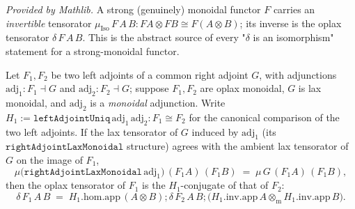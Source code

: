 \begin{lemma}
  \label{lem:functor_monoidal_muiso}
  \mathlibok
  \textit{Provided by Mathlib.}
  A strong (genuinely) monoidal functor \(F\) carries an \emph{invertible} tensorator
  \(\mu_{\mathrm{Iso}}\,F\,A\,B : F A \otimes F B \cong F(A \otimes B)\); its inverse is the oplax
  tensorator \(\delta\,F\,A\,B\). This is the abstract source of every "\(\delta\) is an
  isomorphism" statement for a strong-monoidal functor.
\end{lemma}

\begin{lemma}\leanok
  \label{lem:deltaconjofmucomparison}
  Let \(F_1, F_2\) be two left adjoints of a common right adjoint \(G\), with adjunctions
  \(\mathrm{adj}_1 : F_1 \dashv G\) and \(\mathrm{adj}_2 : F_2 \dashv G\); suppose \(F_1, F_2\) are
  oplax monoidal, \(G\) is lax monoidal, and \(\mathrm{adj}_2\) is a \emph{monoidal} adjunction.
  Write \(H_1 := \mathtt{leftAdjointUniq}\,\mathrm{adj}_1\,\mathrm{adj}_2 : F_1 \cong F_2\) for the
  canonical comparison of the two left adjoints. If the lax tensorator of \(G\) induced by
  \(\mathrm{adj}_1\) (its \(\mathtt{rightAdjointLaxMonoidal}\) structure) agrees with the ambient
  lax tensorator of \(G\) on the image of \(F_1\),
  \[
    \mu\bigl(\mathtt{rightAdjointLaxMonoidal}\,\mathrm{adj}_1\bigr)\,(F_1 A)\,(F_1 B)
      \;=\; \mu\,G\,(F_1 A)\,(F_1 B),
  \]
  then the oplax tensorator of \(F_1\) is the \(H_1\)-conjugate of that of \(F_2\):
  \[
    \delta\,F_1\,A\,B
      \;=\; H_1.\mathrm{hom}.\mathrm{app}\,(A \otimes B)
        \mathbin{;} \delta\,F_2\,A\,B
        \mathbin{;} \bigl(H_1.\mathrm{inv}.\mathrm{app}\,A \otimes_{\mathrm m}
          H_1.\mathrm{inv}.\mathrm{app}\,B\bigr).
  \]
\end{lemma}

